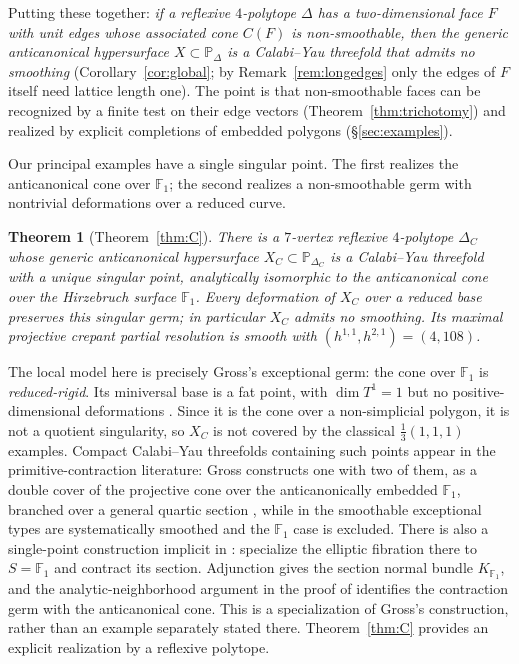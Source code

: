 \documentclass[11pt]{amsart}
\newtheorem{theorem}{Theorem}[section]
\theoremstyle{definition}
\theoremstyle{remark}
\newcommand{\PP}{\mathbb{P}}
\newcommand{\FF}{\mathbb{F}}
\begin{document}
Putting these together: \emph{if a reflexive $4$-polytope $\Delta$ has a
two-dimensional face $F$ with unit edges whose associated cone $C(F)$ is
non-smoothable, then the generic anticanonical hypersurface
$X \subset \PP_\Delta$ is a Calabi--Yau threefold that admits no smoothing}
(Corollary~\ref{cor:global}; by Remark~\ref{rem:longedges} only the edges
of $F$ itself need lattice length one).  The point
is that non-smoothable faces can be recognized by a finite test on their edge
vectors (Theorem~\ref{thm:trichotomy}) and realized by explicit completions
of embedded polygons (\S\ref{sec:examples}).

Our principal examples have a single singular point.  The first realizes
the anticanonical cone over $\FF_1$; the second realizes a non-smoothable
germ with nontrivial deformations over a reduced curve.

\begin{theorem}[Theorem~\ref{thm:C}]\label{thm:introA}
There is a $7$-vertex reflexive $4$-polytope $\Delta_C$ whose generic
anticanonical hypersurface $X_C\subset\PP_{\Delta_C}$ is a Calabi--Yau
threefold with a unique singular point, analytically isomorphic to the
anticanonical cone over the Hirzebruch surface $\FF_1$.  Every deformation of
$X_C$ over a reduced base preserves this singular germ; in particular
$X_C$ admits no smoothing.  Its maximal projective crepant partial resolution
is smooth with $(h^{1,1},h^{2,1})=(4,108)$.
\end{theorem}

The local model here is precisely Gross's exceptional germ: the cone over
$\FF_1$ is \emph{reduced-rigid}.  Its miniversal base is a fat
point, with $\dim T^1 = 1$ but no positive-dimensional deformations
\cite[Example~2.19, \S5.5]{Gross97}.  Since it is the cone over a non-simplicial polygon, it
is not a quotient singularity, so $X_C$ is not covered by the classical
$\frac13(1,1,1)$ examples.  Compact Calabi--Yau threefolds containing such
points appear in the primitive-contraction literature: Gross constructs one
with two of them, as a double cover of the projective cone over the
anticanonically embedded $\FF_1$, branched over a general quartic section
\cite[Example~2.19]{Gross97}, while in \cite{KapustkaKapustka09,Kapustka09}
the smoothable exceptional types are systematically smoothed and the $\FF_1$
case is excluded.  There is also a single-point construction implicit in
\cite[Example~4.1]{Gross97}: specialize the elliptic fibration there to
$S=\FF_1$ and contract its section.  Adjunction gives the section normal
bundle $K_{\FF_1}$, and the analytic-neighborhood argument in the proof of
\cite[Proposition~5.4]{Gross97} identifies the contraction germ with the
anticanonical cone.  This is a specialization of Gross's construction,
rather than an example separately stated there.  Theorem~\ref{thm:C}
provides an explicit realization by a reflexive polytope.
\end{document}
